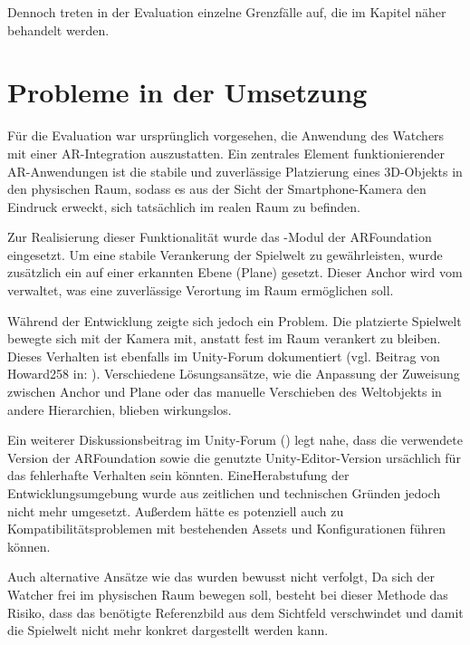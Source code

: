 Dennoch treten in der Evaluation einzelne Grenzfälle auf, die im Kapitel  näher behandelt werden.

\section{Probleme in der Umsetzung}

Für die Evaluation war ursprünglich vorgesehen, die Anwendung des Watchers mit einer \ac{AR}-Integration auszustatten. Ein zentrales Element funktionierender \ac{AR}-Anwendungen ist die stabile und zuverlässige Platzierung eines \ac{3D}-Objekts in den physischen Raum, sodass es aus der Sicht der Smartphone-Kamera den Eindruck erweckt, sich tatsächlich im realen Raum zu befinden.

Zur Realisierung dieser Funktionalität wurde das -Modul der ARFoundation eingesetzt. Um eine stabile Verankerung der Spielwelt zu gewährleisten, wurde zusätzlich ein  auf einer erkannten Ebene (Plane) gesetzt. Dieser Anchor wird vom  verwaltet, was eine zuverlässige Verortung im Raum ermöglichen soll.

Während der Entwicklung zeigte sich jedoch ein Problem. Die platzierte Spielwelt bewegte sich mit der Kamera mit, anstatt fest im Raum verankert zu bleiben. Dieses Verhalten ist ebenfalls im Unity-Forum dokumentiert (vgl. Beitrag von Howard258 in: \citealp{noauthor_unity_2025}). Verschiedene Lösungsansätze, wie die Anpassung der Zuweisung zwischen Anchor und Plane oder das manuelle Verschieben des Weltobjekts in andere Hierarchien, blieben wirkungslos.

Ein weiterer Diskussionsbeitrag im Unity-Forum (\citealp{noauthor_ar_2023}) legt nahe, dass die verwendete Version der ARFoundation sowie die genutzte Unity-Editor-Version ursächlich für das fehlerhafte Verhalten sein könnten. EineHerabstufung der Entwicklungsumgebung wurde aus zeitlichen und technischen Gründen jedoch nicht mehr umgesetzt. Außerdem hätte es potenziell auch zu Kompatibilitätsproblemen mit bestehenden Assets und Konfigurationen führen können.

Auch alternative Ansätze wie das  wurden bewusst nicht verfolgt, Da sich der Watcher frei im physischen Raum bewegen soll, besteht bei dieser Methode das Risiko, dass das benötigte Referenzbild aus dem Sichtfeld verschwindet und damit die Spielwelt nicht mehr konkret dargestellt werden kann.